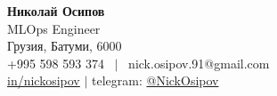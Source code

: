 \documentclass[letterpaper,12pt,english,russian]{fed-res} %
\begin{document}
\begin{center}
    \textbf{\Huge Николай Осипов} \\ \vspace{1pt}
    MLOps Engineer \\ \vspace{1pt}
    Грузия, Батуми, 6000 \\ \vspace{1pt}
    +995 598 593 374 \ $|$ \ nick.osipov.91@gmail.com \\ \vspace{1pt}
    \href{https://www.linkedin.com/in/nickosipov/}{in/nickosipov} $|$ telegram: \href{https://t.me/NickOsipov}{@NickOsipov} \\ \vspace{1pt}
\end{center}







\end{document}
